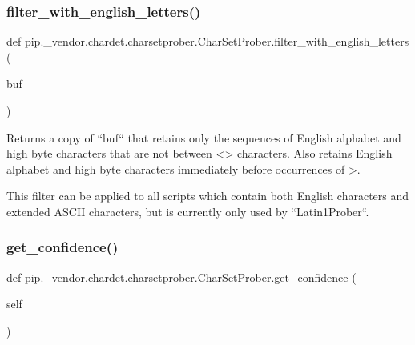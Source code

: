 \subsubsection{\texorpdfstring{filter\+\_\+with\+\_\+english\+\_\+letters()}{filter\_with\_english\_letters()}}
{\footnotesize\ttfamily def pip.\+\_\+vendor.\+chardet.\+charsetprober.\+Char\+Set\+Prober.\+filter\+\_\+with\+\_\+english\+\_\+letters (\begin{DoxyParamCaption}\item[{}]{buf }\end{DoxyParamCaption})\hspace{0.3cm}{\ttfamily [static]}}

\begin{DoxyVerb}Returns a copy of ``buf`` that retains only the sequences of English
alphabet and high byte characters that are not between <> characters.
Also retains English alphabet and high byte characters immediately
before occurrences of >.

This filter can be applied to all scripts which contain both English
characters and extended ASCII characters, but is currently only used by
``Latin1Prober``.
\end{DoxyVerb}
 \mbox{\label{classpip_1_1__vendor_1_1chardet_1_1charsetprober_1_1CharSetProber_a99c08657a0a1ec7a7f8b8609330383fc}} 
\subsubsection{\texorpdfstring{get\+\_\+confidence()}{get\_confidence()}}
{\footnotesize\ttfamily def pip.\+\_\+vendor.\+chardet.\+charsetprober.\+Char\+Set\+Prober.\+get\+\_\+confidence (\begin{DoxyParamCaption}\item[{}]{self }\end{DoxyParamCaption})}

\mbox{\label{classpip_1_1__vendor_1_1chardet_1_1charsetprober_1_1CharSetProber_aa47b12c232a299bee837a8fcb5ef5fb4}} 
